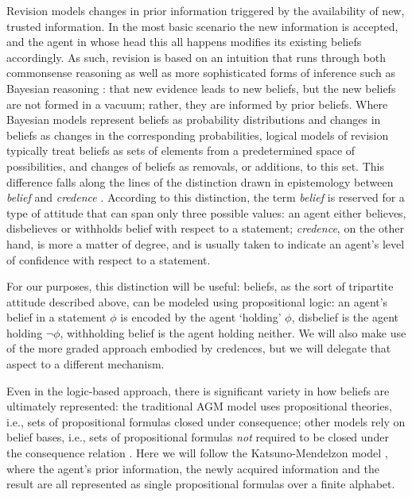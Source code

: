 Revision models changes in prior information triggered by 
the availability of new, trusted information.
In the most basic scenario the new information is accepted, 
and the agent in whose head this all happens
modifies its existing beliefs accordingly.
As such, revision is based on an intuition 
that runs through both commonsense reasoning
as well as more sophisticated forms of inference 
such as Bayesian reasoning \cite{Joyce19,3blue1brown19}:
that new evidence leads to new beliefs, 
but the new beliefs are not formed in a vacuum;
rather, they are informed by prior beliefs.
Where Bayesian models represent beliefs as probability distributions
and changes in beliefs as changes in the corresponding probabilities,
logical models of revision typically treat beliefs as sets of elements 
from a predetermined space of possibilities,
and changes of beliefs as removals, or additions, to this set.
This difference falls along the lines of the distinction drawn in epistemology 
between \emph{belief} and \emph{credence} \cite{Schwitzgebel19,Jackson20}.
According to this distinction, the term \emph{belief} is reserved for 
a type of attitude that can span only three possible values: an agent either believes,
disbelieves or withholds belief with respect to a statement; 
\emph{credence}, on the other hand, is more a matter of degree, and is 
usually taken to indicate an agent's level of confidence with respect to 
a statement.

For our purposes, this distinction will be useful: beliefs,
as the sort of tripartite attitude described above,
can be modeled using propositional logic: an agent's belief 
in a statement $\phi$ is encoded by the agent `holding' $\phi$,
disbelief is the agent holding $\lnot\phi$, 
withholding belief is the agent holding neither.
We will also make use of the more graded approach embodied by credences,
but we will delegate that aspect to a different mechanism.

Even in the logic-based approach,
there is significant variety in how beliefs are 
ultimately represented:
the traditional AGM model uses propositional theories, 
i.e., sets of propositional formulas closed under consequence;
other models rely on belief bases,
i.e., sets of propositional formulas \emph{not} required to be closed 
under the consequence relation \cite{Hansson99a}. 
Here we will follow the Katsuno-Mendelzon model \cite{KatsunoM92}, 
where the agent's prior information, the newly acquired information and the result
are all represented as single propositional formulas over a finite alphabet.

